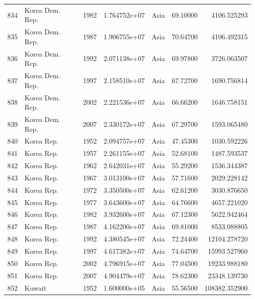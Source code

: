 \documentclass[
  letterpaper,
  DIV=11,
  numbers=noendperiod]{scrreprt}
\begin{document}
\begin{tabular}{llrrlrr}
834  &           Korea Dem. Rep. &  1982 &  1.764752e+07 &      Asia &  69.10000 &    4106.525293 \\
835  &           Korea Dem. Rep. &  1987 &  1.906755e+07 &      Asia &  70.64700 &    4106.492315 \\
836  &           Korea Dem. Rep. &  1992 &  2.071138e+07 &      Asia &  69.97800 &    3726.063507 \\
837  &           Korea Dem. Rep. &  1997 &  2.158510e+07 &      Asia &  67.72700 &    1690.756814 \\
838  &           Korea Dem. Rep. &  2002 &  2.221536e+07 &      Asia &  66.66200 &    1646.758151 \\
839  &           Korea Dem. Rep. &  2007 &  2.330172e+07 &      Asia &  67.29700 &    1593.065480 \\
840  &                Korea Rep. &  1952 &  2.094757e+07 &      Asia &  47.45300 &    1030.592226 \\
841  &                Korea Rep. &  1957 &  2.261155e+07 &      Asia &  52.68100 &    1487.593537 \\
842  &                Korea Rep. &  1962 &  2.642031e+07 &      Asia &  55.29200 &    1536.344387 \\
843  &                Korea Rep. &  1967 &  3.013100e+07 &      Asia &  57.71600 &    2029.228142 \\
844  &                Korea Rep. &  1972 &  3.350500e+07 &      Asia &  62.61200 &    3030.876650 \\
845  &                Korea Rep. &  1977 &  3.643600e+07 &      Asia &  64.76600 &    4657.221020 \\
846  &                Korea Rep. &  1982 &  3.932600e+07 &      Asia &  67.12300 &    5622.942464 \\
847  &                Korea Rep. &  1987 &  4.162200e+07 &      Asia &  69.81000 &    8533.088805 \\
848  &                Korea Rep. &  1992 &  4.380545e+07 &      Asia &  72.24400 &   12104.278720 \\
849  &                Korea Rep. &  1997 &  4.617382e+07 &      Asia &  74.64700 &   15993.527960 \\
850  &                Korea Rep. &  2002 &  4.796915e+07 &      Asia &  77.04500 &   19233.988180 \\
851  &                Korea Rep. &  2007 &  4.904479e+07 &      Asia &  78.62300 &   23348.139730 \\
852  &                    Kuwait &  1952 &  1.600000e+05 &      Asia &  55.56500 &  108382.352900 \\

\end{tabular}
\end{document}
